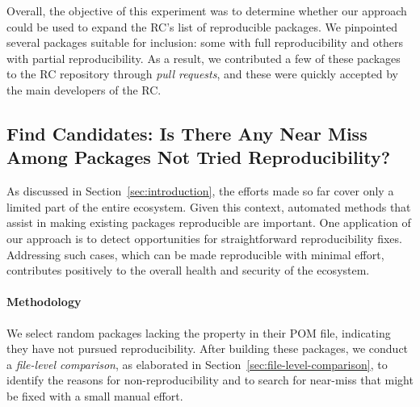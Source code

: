 \documentclass[smallextended]{svjour3}
\newcommand{\secref}[1]{Section~\ref{sec:#1}}
\newcommand{\maven}[1]{\tool{Maven{#1}}}
\begin{document}
Overall, the objective of this experiment was to determine whether our approach could be used to expand the RC's list of reproducible \maven{} packages. We pinpointed several packages suitable for inclusion: some with full reproducibility and others with partial reproducibility. As a result, we contributed a few of these packages to the RC repository through \emph{pull requests}, and these were quickly accepted by the main developers of the RC.

\subsection{Find Candidates: Is There Any Near Miss Among Packages Not Tried Reproducibility?}

As discussed in \secref{introduction}, the efforts made so far cover only a limited part of the entire \maven{} ecosystem. Given this context, automated methods that assist in making existing packages reproducible are important. One application of our approach is to detect opportunities for straightforward reproducibility fixes. Addressing such cases, which can be made reproducible with minimal effort, contributes positively to the overall health and security of the ecosystem.

\paragraph{Methodology}
We select  random packages lacking the  property in their POM file, indicating they have not pursued reproducibility. After building these packages, we conduct a \emph{file-level comparison}, as elaborated in \secref{file-level-comparison}, to identify the reasons for non-reproducibility and to search for near-miss that might be fixed with a small manual effort.
\end{document}
